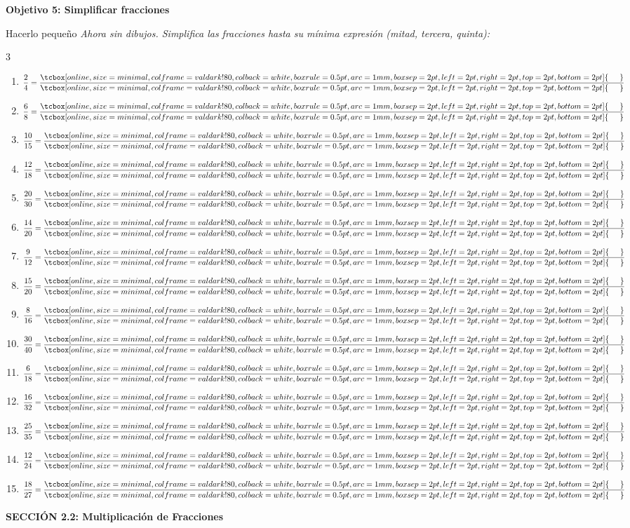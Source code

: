 \documentclass[12pt, letterpaper]{article}
\newenvironment{objetivo}[1]{%
    \begin{tcolorbox}[colback=valblue!10, colframe=valblue, arc=2mm, boxrule=1.5pt]
        {\large\bfseries \ding{118} #1}
    \end{tcolorbox}
}{}
\newcommand{\seccionlibro}[1]{
    \vspace{0.8cm}
    \begin{center}
        \begin{tcolorbox}[colback=valdark, colframe=valdark, coltext=white, arc=2mm, boxrule=0pt, width=\textwidth]
            \centering \LARGE \textbf{#1}
        \end{tcolorbox}
    \end{center}
    \vspace{0.3cm}
}
\newcommand{\boxfill}[1][0.8cm]{\tcbox[on line, size=minimal, colframe=valdark!80, colback=white, boxrule=0.5pt, arc=1mm, boxsep=2pt, left=2pt, right=2pt, top=2pt, bottom=2pt]{\makebox[#1]{\vphantom{M}}}}
\begin{document}
\begin{objetivo}{Objetivo 5: Simplificar fracciones}
    \begin{practica}{Hacerlo pequeño}
        \textit{Ahora sin dibujos. Simplifica las fracciones hasta su mínima expresión (mitad, tercera, quinta):}
        \vspace{0.2cm}
        \begin{multicols}{3}
            \raggedcolumns
            \begin{enumerate}[itemsep=0.4cm]
                \item $\dfrac{2}{4} = \dfrac{\boxfill[0.5cm]}{\boxfill[0.5cm]}$
                \item $\dfrac{6}{8} = \dfrac{\boxfill[0.5cm]}{\boxfill[0.5cm]}$
                \item $\dfrac{10}{15} = \dfrac{\boxfill[0.5cm]}{\boxfill[0.5cm]}$
                \item $\dfrac{12}{18} = \dfrac{\boxfill[0.5cm]}{\boxfill[0.5cm]}$
                \item $\dfrac{20}{30} = \dfrac{\boxfill[0.5cm]}{\boxfill[0.5cm]}$
                \item $\dfrac{14}{20} = \dfrac{\boxfill[0.5cm]}{\boxfill[0.5cm]}$
                \item $\dfrac{9}{12} = \dfrac{\boxfill[0.5cm]}{\boxfill[0.5cm]}$
                \item $\dfrac{15}{20} = \dfrac{\boxfill[0.5cm]}{\boxfill[0.5cm]}$
                \item $\dfrac{8}{16} = \dfrac{\boxfill[0.5cm]}{\boxfill[0.5cm]}$
                \item $\dfrac{30}{40} = \dfrac{\boxfill[0.5cm]}{\boxfill[0.5cm]}$
                \item $\dfrac{6}{18} = \dfrac{\boxfill[0.5cm]}{\boxfill[0.5cm]}$
                \item $\dfrac{16}{32} = \dfrac{\boxfill[0.5cm]}{\boxfill[0.5cm]}$
                \item $\dfrac{25}{35} = \dfrac{\boxfill[0.5cm]}{\boxfill[0.5cm]}$
                \item $\dfrac{12}{24} = \dfrac{\boxfill[0.5cm]}{\boxfill[0.5cm]}$
                \item $\dfrac{18}{27} = \dfrac{\boxfill[0.5cm]}{\boxfill[0.5cm]}$
            \end{enumerate}
        \end{multicols}
    \end{practica}
\end{objetivo}


\seccionlibro{SECCIÓN 2.2: Multiplicación de Fracciones}
\end{document}
